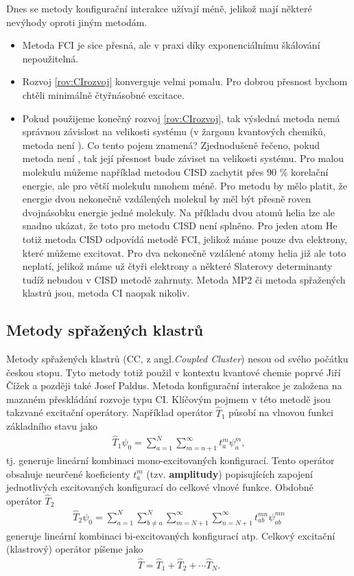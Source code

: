 Dnes se metody konfigurační interakce užívají méně, jelikož mají některé nevýhody oproti jiným metodám. 
\begin{itemize}
\item Metoda FCI je sice přesná, ale v praxi díky exponenciálnímu škálování nepoužitelná.
\item Rozvoj \ref{rov:CIrozvoj} konverguje velmi pomalu. Pro dobrou přesnost bychom chtěli minimálně čtyřnásobné excitace.
\item Pokud použijeme konečný rozvoj \ref{rov:CIrozvoj}, tak výsledná metoda nemá správnou závislost na velikosti systému (v žargonu kvantových chemiků, metoda není ). Co tento pojem znamená? Zjednodušeně řečeno, pokud metoda není , tak její přesnost bude záviset na velikosti systému. Pro malou molekulu můžeme například metodou CISD zachytit přes 90 \% korelační energie, ale pro větší molekulu mnohem méně. Pro  metodu by mělo platit, že energie dvou nekonečně vzdálených molekul by měl být přesně roven dvojnásobku energie jedné molekuly. Na příkladu dvou atomů helia lze ale snadno ukázat, že toto pro metodu CISD není splněno. Pro jeden atom He totiž metoda CISD odpovídá metodě FCI, jelikož máme pouze dva elektrony, které můžeme excitovat. Pro dva nekonečně vzdálené atomy helia již ale toto neplatí, jelikož máme už čtyři elektrony a některé Slaterovy determinanty tudíž nebudou v CISD metodě zahrnuty. 
Metoda MP2 či metoda spřažených klastrů  jsou, metoda CI naopak nikoliv. 
\end{itemize}


\subsection{Metody spřažených klastrů}
Metody spřažených klastrů (CC, z angl.\textit{Coupled Cluster}) nesou od svého počátku českou stopu. Tyto metody totiž použil v kontextu kvantové chemie poprvé Jiří Čížek a později také Josef Paldus. Metoda konfigurační interakce je založena na mazaném přeskládání rozvoje typu CI. Klíčovým pojmem v této metodě jsou takzvané excitační operátory. Například operátor $\hat{T}_1$ působí na vlnovou funkci základního stavu jako
\begin{eqnarray}
\hat{T}_1\psi_0=\sum^N_{a=1}\sum_{m=n+1}^\infty t_a^m\psi_a^m , 
\end{eqnarray}
tj. generuje lineární kombinaci mono-excitovaných konfigurací.  Tento operátor obsahuje neurčené koeficienty $t_a^m$ (tzv. \textbf{amplitudy}) popisujících zapojení jednotlivých excitovaných konfigurací do celkové vlnové funkce. Obdobně operátor $\hat{T}_2$ 
\begin{eqnarray}
\hat{T}_2\psi_0=\sum_{a=1}^N \sum_{b\neq a}^N\sum_{m=N+1}^\infty \sum_{n=N+1}^\infty t_{ab}^{mn}\psi_{ab}^{mn}
\end{eqnarray}
generuje lineární kombinaci  bi-excitovaných konfigurací atp. Celkový excitační (klastrový) operátor píšeme jako
\begin{eqnarray}
\hat{T}=\hat{T}_1+\hat{T}_2+\cdots \hat{T}_N.
\end{eqnarray}

